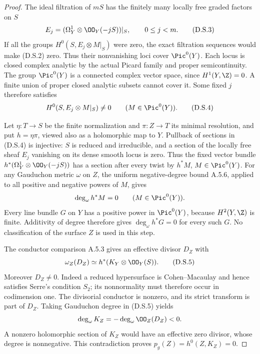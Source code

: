 \begin{proof}
The ideal filtration of $mS$ has the finitely many locally free
graded factors on $S$
\[
 E_j=(\Omega_Y^1\otimes\OO_Y(-jS))|_S,
 \qquad 0\le j<m.
 \tag{D.S.3}
\]
If all the groups $H^0(S,E_j\otimes M|_S)$ were zero, the exact
filtration sequences would make (D.S.2) zero. Thus their
nonvanishing loci cover $\Pic^0(Y)$. Each locus is closed
complex analytic by the actual Picard family and proper
semicontinuity. The group $\Pic^0(Y)$ is a connected complex
vector space, since $H^1(Y,\Z)=0$. A finite union of proper
closed analytic subsets cannot cover it. Some fixed $j$
therefore satisfies
\[
 H^0(S,E_j\otimes M|_S)\ne0
 \qquad(M\in\Pic^0(Y)).
 \tag{D.S.4}
\]

Let $\eta:T\to S$ be the finite normalization and
$\pi:Z\to T$ its minimal resolution, and put $h=\eta\pi$,
viewed also as a holomorphic map to $Y$.
Pullback of sections in (D.S.4) is injective: $S$ is reduced
and irreducible, and a section of the locally free sheaf $E_j$
vanishing on its dense smooth locus is zero. Thus the fixed
vector bundle $h^*(\Omega_Y^1\otimes\OO_Y(-jS))$ has a
section after every twist by $h^*M$, $M\in\Pic^0(Y)$.
For any Gauduchon metric $\omega$ on $Z$, the uniform
negative-degree bound A.5.6, applied to all positive and
negative powers of $M$, gives
\[
 \deg_\omega h^*M=0\qquad(M\in\Pic^0(Y)).
\]
Every line bundle $G$ on $Y$ has a positive power in
$\Pic^0(Y)$, because $H^2(Y,\Z)$ is finite. Additivity of
degree therefore gives $\deg_\omega h^*G=0$ for every such
$G$. No classification of the surface $Z$ is used in this step.

The conductor comparison A.5.3 gives an effective divisor
$D_Z$ with
\[
 \omega_Z(D_Z)\simeq h^*(K_Y\otimes\OO_Y(S)).
 \tag{D.S.5}
\]
Moreover $D_Z\ne0$. Indeed a reduced hypersurface is
Cohen--Macaulay and hence satisfies Serre's condition $S_2$;
its nonnormality must therefore occur in codimension one.
The divisorial conductor is nonzero, and its strict transform
is part of $D_Z$.
Taking Gauduchon degree in (D.S.5) yields
\[
 \deg_\omega K_Z=-\deg_\omega\OO_Z(D_Z)<0.
\]
A nonzero holomorphic section of $K_Z$ would have an effective
zero divisor, whose degree is nonnegative. This contradiction
proves $p_g(Z)=h^0(Z,K_Z)=0$.


\end{proof}
